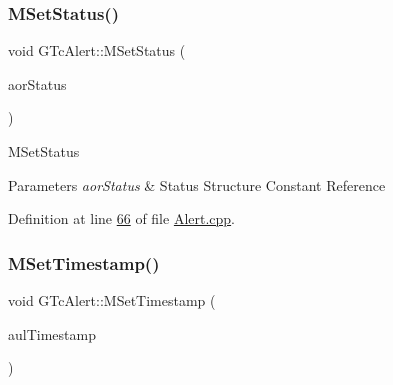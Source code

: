 \mbox{\label{class_g_n_common_1_1_g_n_notification_1_1_g_tc_alert_a92a7aae8f07d48ab0bc5d7256a8bc509}} 
\subsubsection{\texorpdfstring{M\+Set\+Status()}{MSetStatus()}}
{\footnotesize\ttfamily void G\+Tc\+Alert\+::\+M\+Set\+Status (\begin{DoxyParamCaption}\item[{const \mbox{\hyperlink{class_g_n_common_1_1_g_n_notification_1_1_g_tc_status}{G\+Tc\+Status}} \&}]{aor\+Status }\end{DoxyParamCaption})}

M\+Set\+Status 
\begin{DoxyParams}{Parameters}
{\em aor\+Status} & Status Structure Constant Reference \\
\hline
\end{DoxyParams}


Definition at line \mbox{\hyperlink{_alert_8cpp_source_l00066}{66}} of file \mbox{\hyperlink{_alert_8cpp_source}{Alert.\+cpp}}.

\mbox{\label{class_g_n_common_1_1_g_n_notification_1_1_g_tc_alert_a6ca7b4fb9db4072242edf7050c049176}} 
\subsubsection{\texorpdfstring{M\+Set\+Timestamp()}{MSetTimestamp()}}
{\footnotesize\ttfamily void G\+Tc\+Alert\+::\+M\+Set\+Timestamp (\begin{DoxyParamCaption}\item[{const \mbox{\hyperlink{namespace_g_n_common_a9404ee6090c788ae70aebd1436ceb97d}{Tu64}}}]{aul\+Timestamp }\end{DoxyParamCaption})}

